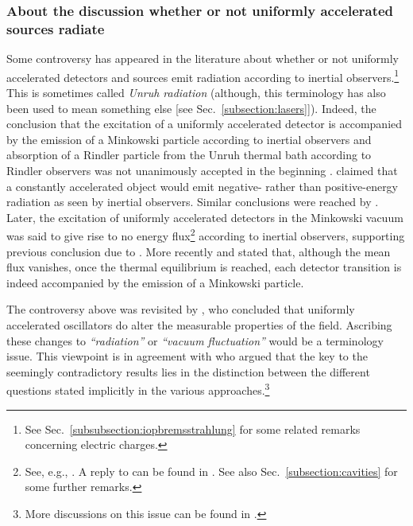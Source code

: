 \documentclass[12pt,nofootinbib,floatfix,aps,prd,showpacs,amsmath,amssymb,eqsecnum]{revtex4-2}
\begin{document}
\subsubsection{About the discussion whether or not uniformly 
               accelerated sources radiate}
\label{subsubsection:controversy1}

Some controversy has appeared in the literature about whether or not 
uniformly accelerated detectors and sources emit radiation according to
inertial observers.\footnote{See Sec.~\ref{subsubsection:iopbremsstrahlung}
for some related remarks concerning electric charges.}
This is sometimes called {\em Unruh radiation} (although, 
this terminology has also been used to mean something else 
[see Sec.~\ref{subsection:lasers}]). Indeed, the conclusion that 
the excitation of a uniformly accelerated detector is accompanied by 
the emission of a Minkowski particle according to inertial observers and 
absorption of a Rindler particle from the Unruh thermal bath according 
to Rindler observers \cite{UnruhWald84} was not unanimously accepted 
in the beginning \cite{Padmanabhan85}. \textcite{Grove86} claimed that a 
constantly accelerated object would emit 
negative- rather than positive-energy radiation as seen by 
inertial observers. Similar conclusions were reached by 
\textcite{Massaretal93}. Later, the excitation of uniformly 
accelerated detectors in the Minkowski vacuum was said to give 
rise to no energy flux\footnote{See, e.g.,
                                \textcite{Hinterleitner93,Huetal04,Huetal04b,Fordetal06}.
                                A reply to \textcite{Huetal04} can be found in
                                \textcite{Scullyetal04}. See also
                                Sec.~\ref{subsection:cavities} for some 
                                further remarks.}
according to inertial observers, supporting previous
conclusion due to \textcite{Raineetal91}. More recently 
\textcite{Parentani95} and \textcite{Massaretal96} stated 
that, although the mean flux vanishes,
once the thermal equilibrium is reached, each 
detector transition is indeed accompanied by the emission of a 
Minkowski particle.

The controversy above was revisited by \textcite{Unruh92}, who concluded 
that uniformly accelerated oscillators do
alter the measurable properties of the field. Ascribing these changes to 
{\em ``radiation''} or {\em ``vacuum fluctuation''} would be a terminology 
issue. This viewpoint 
is in agreement with \textcite{Audretschetal94b} who argued 
that the key to the seemingly contradictory results lies in the distinction 
between the different questions stated implicitly in the various 
approaches.\footnote{More discussions on this issue can
be found in \textcite{Linetal06}.}
\end{document}
